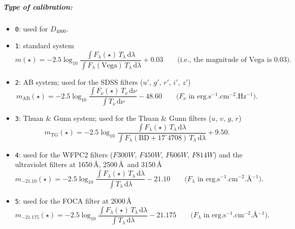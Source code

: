\documentclass[11pt,draft,fleqn]{article}
\begin{document}
\subparagraph{\textit{Type of calibration:}}
\begin{itemize}
\item \texttt{0}: used for $D_{4000}$.
\item \texttt{1}: standard system
\[m(\star)=-2.5\log_{10}\frac{\displaystyle{\int F_{\lambda}(\star)\,
T_{\lambda}\,\mathrm{d}\lambda}}{\displaystyle{\int F_{\lambda}(\mathrm{Vega})
\,T_{\lambda}\,\mathrm{d}\lambda}}+0.03
\qquad\textrm{(i.e.,\ the magnitude of Vega is 0.03).}\]
\item \texttt{2}: AB system; used for the SDSS filters ($u'$, $g'$, $r'$,
$i'$, $z'$)
\[m_{\mathrm{AB}}(\star)=-2.5\log_{10}\frac{\displaystyle{\int F_{\nu}(\star)
\,T_{\nu}\,\mathrm{d}\nu}}{\displaystyle{\int T_{\nu}\,\mathrm{d}\nu}}-48.60
\qquad\textrm{($F_{\nu}$ in erg.s$^{-1}$.cm$^{-2}$.Hz$^{-1}$).}\]
\item \texttt{3}: Thuan \& Gunn system; used for the Thuan \& Gunn filters
($u$, $v$, $g$, $r$)
\[m_{\mathrm{TG}}(\star)=-2.5\log_{10}\frac{\displaystyle{\int F_{\lambda}(\star)
\,T_{\lambda}\,\mathrm{d}\lambda}}{\displaystyle{\int F_{\lambda}(\mathrm{BD+17^{\circ}4708})
\,T_{\lambda}\,\mathrm{d}\lambda}}+9.50.\]
\item \texttt{4}: used for the WFPC2 filters ($F300W$, $F450W$, $F606W$, $F814W$)
and the ultraviolet filters at 1650\,\AA, 2500\,\AA\ and 3150\,\AA
\[m_{-21.10}(\star)=-2.5\log_{10}\frac{\displaystyle{\int F_{\lambda}(\star)
\,T_{\lambda}\,\mathrm{d}\lambda}}{\displaystyle{\int T_{\lambda}\,\mathrm{d}\lambda}}-21.10
\qquad\textrm{($F_{\lambda}$ in erg.s$^{-1}$.cm$^{-2}$.\AA$^{-1}$).}\]
\item \texttt{5}: used for the FOCA filter at 2000\,\AA
\[m_{-21.175}(\star)=-2.5\log_{10}\frac{\displaystyle{\int F_{\lambda}(\star)
\,T_{\lambda}\,\mathrm{d}\lambda}}{\displaystyle{\int T_{\lambda}\,\mathrm{d}\lambda}}-21.175
\qquad\textrm{($F_{\lambda}$ in erg.s$^{-1}$.cm$^{-2}$.\AA$^{-1}$).}\]
\end{itemize}
\end{document}
